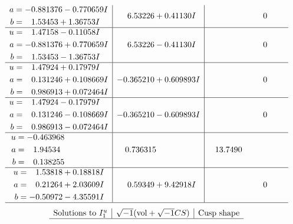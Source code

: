 \documentclass[1p]{elsarticle_modified}
\theoremstyle{definition}
\newcommand{\I}{\sqrt{-1}}
\begin{document}
$$\begin{array}{c|c|c}
\begin{aligned}
a &= -0.881376 - 0.770659 I \\
b &= \phantom{-}1.53453 + 1.36753 I\end{aligned}
 & \phantom{-}6.53226 + 0.41130 I & \phantom{-0.000000 } 0 \\ \hline\begin{aligned}
u &= \phantom{-}1.47158 - 0.11058 I \\
a &= -0.881376 + 0.770659 I \\
b &= \phantom{-}1.53453 - 1.36753 I\end{aligned}
 & \phantom{-}6.53226 - 0.41130 I & \phantom{-0.000000 } 0 \\ \hline\begin{aligned}
u &= \phantom{-}1.47924 + 0.17979 I \\
a &= \phantom{-}0.131246 + 0.108669 I \\
b &= \phantom{-}0.986913 + 0.072464 I\end{aligned}
 & -0.365210 + 0.609893 I & \phantom{-0.000000 } 0 \\ \hline\begin{aligned}
u &= \phantom{-}1.47924 - 0.17979 I \\
a &= \phantom{-}0.131246 - 0.108669 I \\
b &= \phantom{-}0.986913 - 0.072464 I\end{aligned}
 & -0.365210 - 0.609893 I & \phantom{-0.000000 } 0 \\ \hline\begin{aligned}
u &= -0.463968\phantom{ +0.000000I} \\
a &= \phantom{-}1.94534\phantom{ +0.000000I} \\
b &= \phantom{-}0.138255\phantom{ +0.000000I}\end{aligned}
 & \phantom{-}0.736315\phantom{ +0.000000I} & \phantom{-}13.7490\phantom{ +0.000000I} \\ \hline\begin{aligned}
u &= \phantom{-}1.53818 + 0.18818 I \\
a &= \phantom{-}0.21264 + 2.03609 I \\
b &= -0.50972 - 4.35591 I\end{aligned}
 & \phantom{-}0.59349 + 9.42918 I & \phantom{-0.000000 } 0\\
 \hline 
 \end{array}$$\newpage$$\begin{array}{c|c|c}  
\text{Solutions to }I^u_{1}& \I (\text{vol} + \sqrt{-1}CS) & \text{Cusp shape}\\
 \hline 

\end{array}$$
\end{document}
